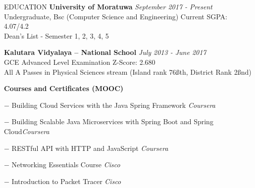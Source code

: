 \documentclass{cv}
\begin{document}
\begin{rSection}{EDUCATION}
    {\bf University of Moratuwa}                                \hfill {\em September 2017 - Present}
    \\ Undergraduate, Bsc (Computer Science and Engineering)    \hfill { Current SGPA: 4.07/4.2 }
    \\ Dean's List - Semester 1, 2, 3, 4, 5 \par

    {\bf Kalutara Vidyalaya – National School}                  \hfill {\em July 2013 - June 2017}
    \\ GCE Advanced Level Examination                           \hfill { Z-Score: 2.680 }
    \\ All A Passes in Physical Sciences stream (Island rank 76\ss{th}, District Rank 2\ss{nd}) \par

    {\bf Courses and Certificates (MOOC)}
    \vspace{-4pt}
    \begin{compactitem}
        \item[$-$]  { Building Cloud Services with the Java Spring Framework}                \hfill {\em Coursera}
        \item[$-$]  { Building Scalable Java Microservices with Spring Boot and Spring Cloud}\hfill {\em Coursera}
        \item[$-$]  { RESTful API with HTTP and JavaScript}                                  \hfill {\em Coursera}
        \item[$-$]  { Networking Essentials Course}                                                 \hfill {\em Cisco}
        \item[$-$]  { Introduction to Packet Tracer}                                         \hfill {\em Cisco}
    \end{compactitem}
\end{rSection}


\end{document}
